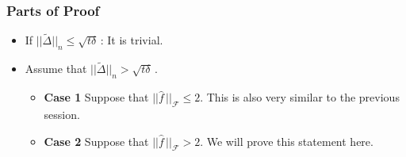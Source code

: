 \documentclass[11pt]{beamer}
\newcommand{\Prob}{\mathbb{P}}
\newcommand{\bx}{\mathbf{x}}
\newcommand{\cF}{\mathcal{F}}
\newcommand{\fstar}{f\,^\star}
\newcommand{\fhat}{\widehat{f}}
\newcommand{\ftilde}{\widetilde{f}}
\newcommand{\Dhat}{\widehat{\Delta}}
\newcommand{\Dtilde}{\widetilde{\Delta}}
\begin{document}
	\begin{frame}
		\frametitle{Parts of Proof}	
		\begin{itemize}
			\item If \textbf{$||\Dtilde||_n \leq \sqrt{t\delta}\,$}: It is trivial. 
			
			\item 
			Assume that \textbf{$||\Dtilde||_n > \sqrt{t\delta}\,$}. 
			\begin{itemize}
				\item \textbf{Case 1} Suppose that $||\fhat\,||_\cF \leq 2$.  This is also very similar to the previous session.
				\item \textbf{Case 2} Suppose that $||\fhat\,||_\cF > 2$. We will prove this statement here.
			\end{itemize}			
		\end{itemize}
	\end{frame}
	
%
%						
%					
%
%
	
\end{document}
